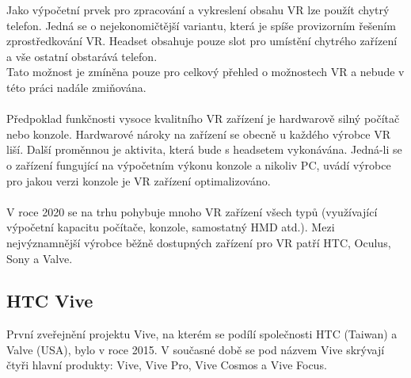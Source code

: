 \documentclass[a4paper, 12pt]{report}
\begin{document}
Jako výpočetní prvek pro zpracování a vykreslení obsahu VR lze použít chytrý telefon. Jedná se o nejekonomičtější variantu, která je spíše provizorním řešením zprostředkování VR. Headset obsahuje pouze slot pro umístění chytrého zařízení a vše ostatní obstarává telefon.\\
Tato možnost je zmíněna pouze pro celkový přehled o možnostech VR a nebude v této práci nadále zmiňována.\\
\\
Předpoklad funkčnosti vysoce kvalitního VR zařízení je hardwarově silný počítač nebo konzole. Hardwarové nároky na zařízení se obecně u každého výrobce VR liší. Další proměnnou je aktivita, která bude s headsetem vykonávána. Jedná-li se o zařízení fungující na výpočetním výkonu konzole a nikoliv PC, uvádí výrobce pro jakou verzi konzole je VR zařízení optimalizováno. \\
\\    
V roce 2020 se na trhu pohybuje mnoho VR zařízení všech typů (využívající výpočetní kapacitu počítače, konzole, samostatný HMD atd.). Mezi nejvýznamnější výrobce běžně dostupných zařízení pro VR patří HTC, Oculus, Sony a Valve. 

\subsection{HTC Vive}
První zveřejnění projektu Vive, na kterém se podílí společnosti HTC (Taiwan) a Valve (USA), bylo v roce 2015. V současné době se pod názvem Vive skrývají čtyři hlavní produkty: Vive, Vive Pro, Vive Cosmos  a Vive Focus.\\
\end{document}
